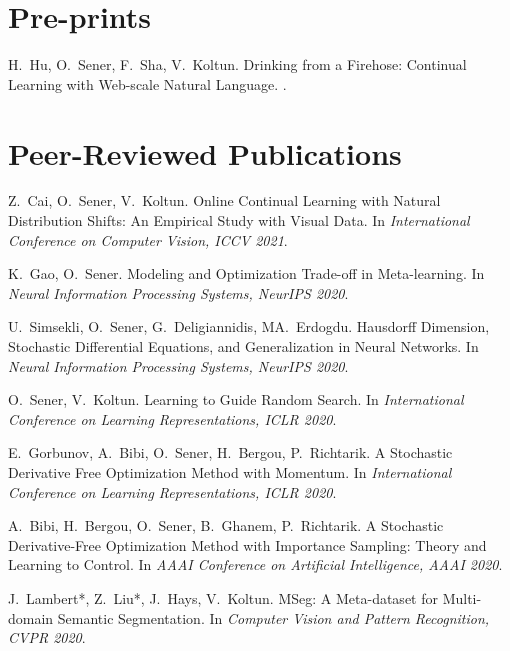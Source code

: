 
\section{\mysidestyle \textcolor{olgray}{Pre-prints}}
H.~Hu, O.~Sener, F.~Sha, V.~Koltun.
\newblock Drinking from a Firehose: Continual Learning with Web-scale Natural Language. 
.

\section{\mysidestyle \textcolor{olgray}{Peer-Reviewed Publications}}
Z.~Cai, O.~Sener, V.~Koltun.
\newblock Online Continual Learning with Natural Distribution Shifts: An Empirical Study with Visual Data.
\newblock In {\em International Conference on Computer Vision, ICCV 2021}.
\vspace{-2mm}

K.~Gao, O.~Sener.
\newblock Modeling and Optimization Trade-off in Meta-learning. 
\newblock In {\em Neural Information Processing Systems, NeurIPS 2020}.
\vspace{-2mm}

U.~Simsekli, O.~Sener, G.~Deligiannidis, MA.~Erdogdu.
\newblock Hausdorff Dimension, Stochastic Differential Equations, and Generalization in Neural Networks. 
\newblock In {\em Neural Information Processing Systems, NeurIPS 2020}.
\vspace{-2mm}

O.~Sener, V.~Koltun.
\newblock Learning to Guide Random Search. 
\newblock In {\em International Conference on Learning Representations, ICLR 2020}.
\vspace{-2mm}

E.~Gorbunov, A.~Bibi, O.~Sener, H.~Bergou, P.~Richtarik.
\newblock A Stochastic Derivative Free Optimization Method with Momentum. 
\newblock In {\em International Conference on Learning Representations, ICLR 2020}.
\vspace{-2mm}

A.~Bibi, H.~Bergou, O.~Sener, B.~Ghanem, P.~Richtarik.
\newblock A Stochastic Derivative-Free Optimization Method with Importance Sampling: Theory and Learning to Control. 
\newblock In {\em AAAI Conference on Artificial Intelligence, AAAI 2020}.
\vspace{-2mm}

J.~Lambert*, Z.~Liu*, J.~Hays, V.~Koltun.
\newblock MSeg: A Meta-dataset for Multi-domain Semantic Segmentation. 
\newblock In {\em Computer Vision and Pattern Recognition, CVPR 2020}.
\vspace{-2mm}


